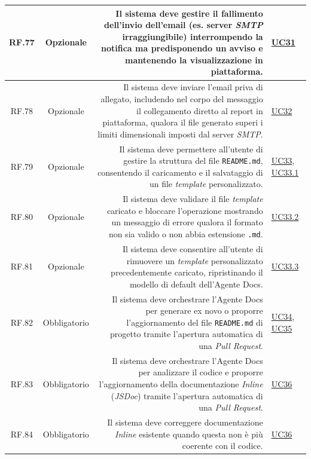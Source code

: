 \documentclass[12pt, a4paper]{article}
\begin{document}
\begin{xltabular}{\textwidth}{|c|c|D|F|}
    RF.77 & Opzionale & Il sistema deve gestire il fallimento dell'invio dell'email (es. server \textit{SMTP} irraggiungibile) interrompendo la notifica ma predisponendo un avviso e mantenendo la visualizzazione in piattaforma. & \hyperref[uc:31]{UC31} \\ \hline
    
    RF.78 & Opzionale & Il sistema deve inviare l'email priva di allegato, includendo nel corpo del messaggio il collegamento diretto al report in piattaforma, qualora il file generato superi i limiti dimensionali imposti dal server \textit{SMTP}. & \hyperref[uc:32]{UC32} \\ \hline

    RF.79 & Opzionale & Il sistema deve permettere all'utente di gestire la struttura del file \texttt{README.md}, consentendo il caricamento e il salvataggio di un file \textit{template} personalizzato. & \hyperref[uc:33]{UC33}, \hyperref[uc:33.1]{UC33.1} \\ \hline
    
    RF.80 & Opzionale & Il sistema deve validare il file \textit{template} caricato e bloccare l'operazione mostrando un messaggio di errore qualora il formato non sia valido o non abbia estensione \texttt{.md}. & \hyperref[uc:33.2]{UC33.2} \\ \hline
    
    RF.81 & Opzionale & Il sistema deve consentire all'utente di rimuovere un \textit{template} personalizzato precedentemente caricato, ripristinando il modello di default dell'Agente Docs. & \hyperref[uc:33.3]{UC33.3} \\ \hline
    
    RF.82 & Obbligatorio & Il sistema deve orchestrare l'Agente Docs per generare ex novo o proporre l'aggiornamento del file \texttt{README.md} di progetto tramite l'apertura automatica di una \textit{Pull Request}. & \hyperref[uc:34]{UC34}, \hyperref[uc:35]{UC35} \\ \hline
    
    RF.83 & Obbligatorio & Il sistema deve orchestrare l'Agente Docs per analizzare il codice e proporre l'aggiornamento della documentazione \textit{Inline} (\textit{JSDoc}) tramite l'apertura automatica di una \textit{Pull Request}. & \hyperref[uc:36]{UC36} \\ \hline

    RF.84 & Obbligatorio & Il sistema deve correggere documentazione \textit{Inline} esistente quando questa non è più coerente con il codice. & \hyperref[uc:36]{UC36} \\ \hline
    

\end{xltabular}
\end{document}
